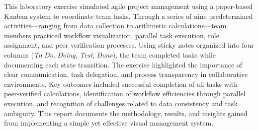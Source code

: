 
This laboratory exercise simulated agile project management using a paper-based Kanban system to coordinate team tasks. Through a series of nine predetermined activities—ranging from data collection to arithmetic calculations—team members practiced workflow visualization, parallel task execution, role assignment, and peer verification processes. Using sticky notes organized into four columns (\textit{To Do}, \textit{Doing}, \textit{Test}, \textit{Done}), the team completed tasks while documenting each state transition. The exercise highlighted the importance of clear communication, task delegation, and process transparency in collaborative environments. Key outcomes included successful completion of all tasks with peer-verified calculations, identification of workflow efficiencies through parallel execution, and recognition of challenges related to data consistency and task ambiguity. This report documents the methodology, results, and insights gained from implementing a simple yet effective visual management system.
\endinput
